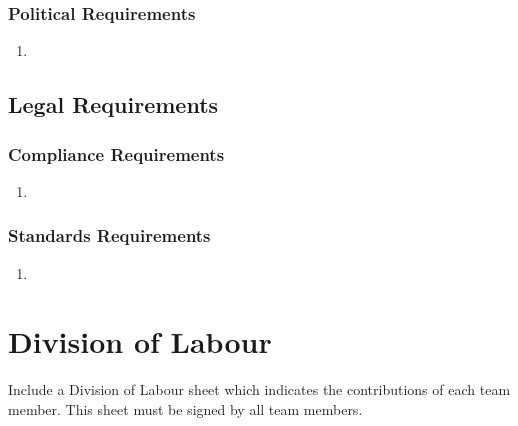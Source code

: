 \documentclass[]{article}
\begin{document}
\subsubsection{Political Requirements}
\label{ssub:political_requirements}
\begin{enumerate}[{CP}1. ]
	\item 
\end{enumerate}


\subsection{Legal Requirements}
\label{sub:legal_requirements}

\subsubsection{Compliance Requirements}
\label{ssub:compliance_requirements}
\begin{enumerate}[{LR}1. ]
	\item 
\end{enumerate}

\subsubsection{Standards Requirements}
\label{ssub:standards_requirements}
\begin{enumerate}[{LR}1. ]
	\item 
\end{enumerate}



\appendix
\section{Division of Labour}
\label{sec:division_of_labour}
Include a Division of Labour sheet which indicates the contributions of each team member. This sheet must be signed by all team members.

\newpage
\end{document}
